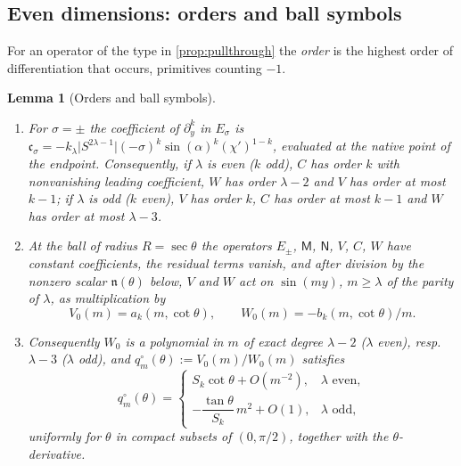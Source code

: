 \documentclass[11pt]{amsart}
\numberwithin{equation}{section}
\newtheorem{lemma}[theorem]{Lemma}
\theoremstyle{definition}
\theoremstyle{remark}
\newcommand{\abs}[1]{\lvert #1\rvert}
\begin{document}
\subsection{Even dimensions: orders and ball symbols}
For an operator of the type in \cref{prop:pullthrough} the \emph{order} is the highest order of differentiation that occurs, primitives counting $-1$.

\begin{lemma}[Orders and ball symbols]\label{lem:orders}
\begin{enumerate}[label=\textup{(\alph*)}]
\item For $\sigma=\pm$ the coefficient of $\partial_y^k$ in $E_\sigma$ is $\mathfrak c_\sigma=-k_\lambda\abs{S^{2\lambda-1}}(-\sigma)^k\sin(\alpha)^k(\chi')^{1-k}$, evaluated at the native point of the endpoint. Consequently, if $\lambda$ is even ($k$ odd), $C$ has order $k$ with nonvanishing leading coefficient, $W$ has order $\lambda-2$ and $V$ has order at most $k-1$; if $\lambda$ is odd ($k$ even), $V$ has order $k$, $C$ has order at most $k-1$ and $W$ has order at most $\lambda-3$.
\item At the ball of radius $R=\sec\theta$ the operators $E_\pm$, $\mathsf M$, $\mathsf N$, $V$, $C$, $W$ have constant coefficients, the residual terms vanish, and after division by the nonzero scalar $\mathfrak n(\theta)$ below, $V$ and $W$ act on $\sin(my)$, $m\ge\lambda$ of the parity of $\lambda$, as multiplication by
\begin{equation}\label{eq:ballsymbols}
V_0(m)=a_k(m,\cot\theta),\qquad W_0(m)=-b_k(m,\cot\theta)/m .
\end{equation}
\item Consequently $W_0$ is a polynomial in $m$ of exact degree $\lambda-2$ ($\lambda$ even), resp.\ $\lambda-3$ ($\lambda$ odd), and $q^\circ_m(\theta):=V_0(m)/W_0(m)$ satisfies
\begin{equation}\label{eq:Q0}
q^\circ_m(\theta)=\begin{cases}S_k\cot\theta+O(m^{-2}),&\lambda\text{ even},\\-\dfrac{\tan\theta}{S_k}\,m^2+O(1),&\lambda\text{ odd},\end{cases}
\end{equation}
uniformly for $\theta$ in compact subsets of $(0,\pi/2)$, together with the $\theta$-derivative.
\end{enumerate}
\end{lemma}
\end{document}
